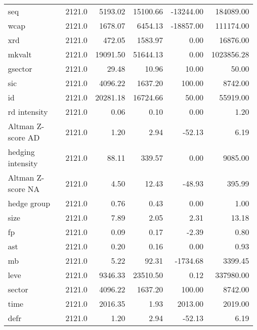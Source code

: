 \begin{tabular}{lrrrrr}
seq               &  2121.0 &   5193.02 &  15100.66 & -13244.00 &   184089.00 \\
wcap              &  2121.0 &   1678.07 &   6454.13 & -18857.00 &   111174.00 \\
xrd               &  2121.0 &    472.05 &   1583.97 &      0.00 &    16876.00 \\
mkvalt            &  2121.0 &  19091.50 &  51644.13 &      0.00 &  1023856.28 \\
gsector           &  2121.0 &     29.48 &     10.96 &     10.00 &       50.00 \\
sic               &  2121.0 &   4096.22 &   1637.20 &    100.00 &     8742.00 \\
id                &  2121.0 &  20281.18 &  16724.66 &     50.00 &    55919.00 \\
rd intensity      &  2121.0 &      0.06 &      0.10 &      0.00 &        1.20 \\
Altman Z-score AD &  2121.0 &      1.20 &      2.94 &    -52.13 &        6.19 \\
hedging intensity &  2121.0 &     88.11 &    339.57 &      0.00 &     9085.00 \\
Altman Z-score NA &  2121.0 &      4.50 &     12.43 &    -48.93 &      395.99 \\
hedge group       &  2121.0 &      0.76 &      0.43 &      0.00 &        1.00 \\
size              &  2121.0 &      7.89 &      2.05 &      2.31 &       13.18 \\
fp                &  2121.0 &      0.09 &      0.17 &     -2.39 &        0.80 \\
ast               &  2121.0 &      0.20 &      0.16 &      0.00 &        0.93 \\
mb                &  2121.0 &      5.22 &     92.31 &  -1734.68 &     3399.45 \\
leve              &  2121.0 &   9346.33 &  23510.50 &      0.12 &   337980.00 \\
sector            &  2121.0 &   4096.22 &   1637.20 &    100.00 &     8742.00 \\
time              &  2121.0 &   2016.35 &      1.93 &   2013.00 &     2019.00 \\
defr              &  2121.0 &      1.20 &      2.94 &    -52.13 &        6.19 \\
\bottomrule
\end{tabular}

